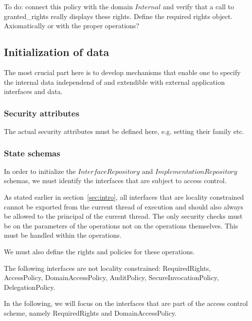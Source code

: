To do: connect this policy with the domain $Internal$ and verify that a call to
granted\_rights really displays these rights.  Define the required rights
object.  Axiomatically or with the proper operations?


\subsection{Initialization of data} \label{sec:init-data}
The most crucial part here is to develop mechanisms that enable one to specify
the internal data independend of and extendible with external application
interfaces and data.


\subsubsection{Security attributes}
The actual security attributes must be defined here, e.g. setting their family
etc.

\subsubsection{State schemas}
In order to initialize the $InterfaceRepository$ and $ImplementationRepository$
schemas, we must identify the interfaces that are subject to access control.

As stated earlier in section~\ref{sec:intro}, all interfaces that are locality
constrained cannot be exported from the current thread of execution and should
also always be allowed to the principal of the current thread.  The only
security checks must be on the parameters of the operations not on the
operations themselves.  This must be handled within the operations.

We must also define the rights and policies for these operations.

The following interfaces are not locality constrained: RequiredRights,
AccessPolicy, DomainAccessPolicy, AuditPolicy, SecureInvocationPolicy,
DelegationPolicy.

In the following, we will focus on the interfaces that are part of the access
control scheme, namely RequiredRights and DomainAccessPolicy. 


